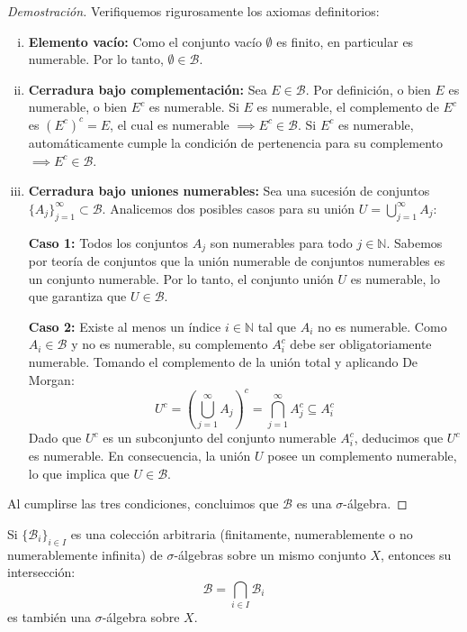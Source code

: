\begin{proof}[Demostración]
	Verifiquemos rigurosamente los axiomas definitorios:
	\begin{enumerate}[i)]
		\item \textbf{Elemento vacío:} Como el conjunto vacío $\emptyset$ es finito, en particular es numerable. Por lo tanto, $\emptyset \in \mathcal{B}$.
		\item \textbf{Cerradura bajo complementación:} Sea $E \in \mathcal{B}$. Por definición, o bien $E$ es numerable, o bien $E^c$ es numerable. 
		Si $E$ es numerable, el complemento de $E^c$ es $(E^c)^c = E$, el cual es numerable $\implies E^c \in \mathcal{B}$.
		Si $E^c$ es numerable, automáticamente cumple la condición de pertenencia para su complemento $\implies E^c \in \mathcal{B}$.
		\item \textbf{Cerradura bajo uniones numerables:} Sea una sucesión de conjuntos $\{A_j\}_{j=1}^\infty \subset \mathcal{B}$. Analicemos dos posibles casos para su unión $U = \bigcup_{j=1}^\infty A_j$:
		
		\textbf{Caso 1:} Todos los conjuntos $A_j$ son numerables para todo $j \in \mathbb{N}$. 
		Sabemos por teoría de conjuntos que la unión numerable de conjuntos numerables es un conjunto numerable. Por lo tanto, el conjunto unión $U$ es numerable, lo que garantiza que $U \in \mathcal{B}$.
		
		\textbf{Caso 2:} Existe al menos un índice $i \in \mathbb{N}$ tal que $A_i$ no es numerable.
		Como $A_i \in \mathcal{B}$ y no es numerable, su complemento $A_i^c$ debe ser obligatoriamente numerable. Tomando el complemento de la unión total y aplicando De Morgan:
		$$ U^c = \left( \bigcup_{j=1}^\infty A_j \right)^c = \bigcap_{j=1}^\infty A_j^c \subseteq A_i^c $$
		Dado que $U^c$ es un subconjunto del conjunto numerable $A_i^c$, deducimos que $U^c$ es numerable. En consecuencia, la unión $U$ posee un complemento numerable, lo que implica que $U \in \mathcal{B}$.
	\end{enumerate}
	Al cumplirse las tres condiciones, concluimos que $\mathcal{B}$ es una $\sigma$-álgebra.
\end{proof}

\begin{proposicion}
	Si $\{\mathcal{B}_i\}_{i \in I}$ es una colección arbitraria (finitamente, numerablemente o no numerablemente infinita) de $\sigma$-álgebras sobre un mismo conjunto $X$, entonces su intersección:
	$$ \mathcal{B} = \bigcap_{i \in I} \mathcal{B}_i $$
	es también una $\sigma$-álgebra sobre $X$.
\end{proposicion}

